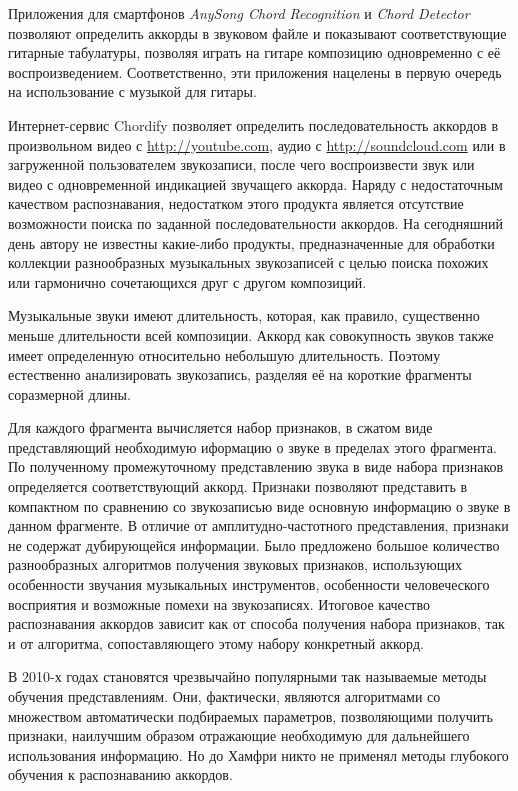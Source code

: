 Приложения для смартфонов \emph{AnySong Chord Recognition}
\cite{AnySongChordRecognition} и \emph{Chord Detector} \cite{ChordDetector} позволяют
определить аккорды в звуковом файле и показывают соответствующие гитарные
табулатуры, позволяя играть на гитаре композицию одновременно с её
воспроизведением. Соответственно, эти приложения нацелены в первую очередь на
использование с музыкой для гитары.

Интернет-сервис Chordify \cite{Chordify} позволяет определить последовательность
аккордов в произвольном видео с \url{http://youtube.com}, аудио с
\url{http://soundcloud.com} или в загруженной пользователем звукозаписи, после
чего воспроизвести звук или видео с одновременной индикацией звучащего аккорда.
Наряду с недостаточным качеством распознавания, недостатком этого продукта
является отсутствие возможности поиска по заданной последовательности аккордов.
На сегодняшний день автору не известны какие-либо продукты, предназначенные для
обработки коллекции разнообразных музыкальных звукозаписей с целью поиска
похожих или гармонично сочетающихся друг с другом композиций.

Музыкальные звуки имеют длительность, которая, как правило, существенно меньше
длительности всей композиции. Аккорд как совокупность звуков также имеет
определенную относительно небольшую длительность. Поэтому естественно
анализировать звукозапись, разделяя её на короткие фрагменты соразмерной длины.

Для каждого фрагмента вычисляется набор признаков, в сжатом виде представляющий
необходимую иформацию о звуке в пределах этого фрагмента. По полученному
промежуточному представлению звука в виде набора признаков определяется
соответствующий аккорд. Признаки позволяют представить в компактном по
сравнению со звукозаписью виде основную информацию о звуке в данном фрагменте.
В отличие от амплитудно-частотного представления, признаки не содержат
дубирующейся информации. Было предложено большое количество разнообразных
алгоритмов получения звуковых признаков, использующих особенности звучания
музыкальных инструментов, особенности человеческого восприятия и возможные
помехи на звукозаписях. Итоговое качество распознавания аккордов зависит как от
способа получения набора признаков, так и от алгоритма, сопоставляющего этому
набору конкретный аккорд.

В 2010-х годах становятся чрезвычайно популярными так называемые методы
обучения представлениям. Они, фактически, являются алгоритмами со множеством
автоматически подбираемых параметров, позволяющими получить признаки, наилучшим
образом отражающие необходимую для дальнейшего использования информацию. Но до
Хамфри \cite{Humphrey2012} никто не применял методы глубокого обучения к
распознаванию аккордов.

